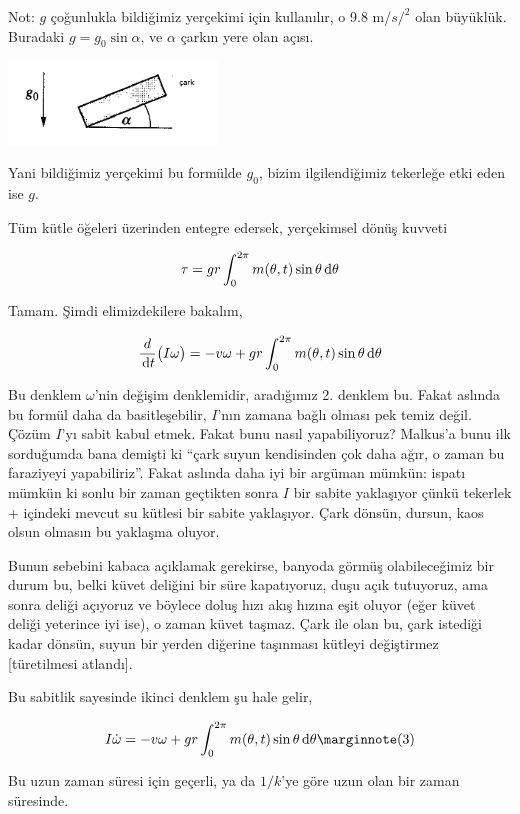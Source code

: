 \documentclass[12pt,fleqn]{article}\usepackage{../../common}
\begin{document}
Not: $g$ çoğunlukla bildiğimiz yerçekimi için kullanılır, o 9.8 m/$s/^2$
olan büyüklük. Buradaki $g = g_0 \sin \alpha$, ve $\alpha$ çarkın yere olan
açısı. 

\includegraphics[width=15em]{15_06.png}

Yani bildiğimiz yerçekimi bu formülde $g_0$, bizim ilgilendiğimiz tekerleğe
etki eden ise $g$. 

Tüm kütle öğeleri üzerinden entegre edersek, yerçekimsel dönüş kuvveti

$$ 
\tau = gr \int_{0}^{2\pi} m(\theta, t) \sin\theta\,\mathrm{d}\theta
$$

Tamam. Şimdi elimizdekilere bakalım, 

$$ 
\frac{d}{\,\mathrm{d} t} \big( I\omega \big) = 
-v \omega + gr  \int_{0}^{2\pi} m(\theta, t) \sin\theta\,\mathrm{d}\theta
$$

Bu denklem $\omega$'nin değişim denklemidir, aradığımız 2. denklem
bu. Fakat aslında bu formül daha da basitleşebilir, $I$'nın zamana bağlı
olması pek temiz değil. Çözüm $I$'yı sabit kabul etmek. Fakat bunu nasıl
yapabiliyoruz? Malkus'a bunu ilk sorduğumda bana demişti ki ``çark suyun
kendisinden çok daha ağır, o zaman bu faraziyeyi yapabiliriz''. Fakat
aslında daha iyi bir argüman mümkün: ispatı mümkün ki sonlu bir zaman
geçtikten sonra $I$ bir sabite yaklaşıyor çünkü tekerlek + içindeki mevcut
su kütlesi bir sabite yaklaşıyor. Çark dönsün, dursun, kaos olsun olmasın
bu yaklaşma oluyor.

Bunun sebebini kabaca açıklamak gerekirse, banyoda görmüş olabileceğimiz
bir durum bu, belki küvet deliğini bir süre kapatıyoruz, duşu açık
tutuyoruz, ama sonra deliği açıyoruz ve böylece doluş hızı akış hızına eşit
oluyor (eğer küvet deliği yeterince iyi ise), o zaman küvet taşmaz. Çark
ile olan bu, çark istediği kadar dönsün, suyun bir yerden diğerine
taşınması kütleyi değiştirmez [türetilmesi atlandı].

Bu sabitlik sayesinde ikinci denklem şu hale gelir, 

$$ 
I\dot{\omega} = -v\omega + gr \int_{0}^{2\pi} m(\theta,t) \sin\theta
\ud\theta 
\mlabel{3}
$$

Bu uzun zaman süresi için geçerli, ya da $1/k$'ye göre uzun olan bir zaman
süresinde. 
\end{document}
